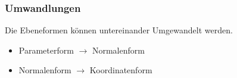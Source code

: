 \subsubsection{Umwandlungen}
Die Ebeneformen können untereinander Umgewandelt werden. 
\begin{itemize}
    \item Parameterform $\rightarrow$ Normalenform
    \item Normalenform $\rightarrow$ Koordinatenform
\end{itemize}
